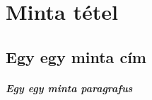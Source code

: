 \chapter{Minta tétel} %
\label{ch:minta}

\section{Egy egy minta cím}

\paragraph{Egy egy minta paragrafus}

\lipsum[1-2]
